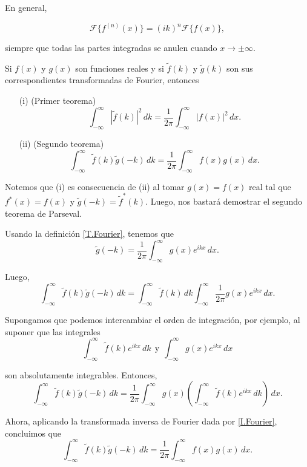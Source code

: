 En general,
\begin{shaded}
$$\mathcal{F}\{f^{(n)} (x)\} = (i k)^n \mathcal{F}\{f(x)\},$$    
\end{shaded}

siempre que todas las partes integradas se anulen cuando $x \to \pm \infty$.

\begin{teorema}[de Parseval]
Si $f(x)$ y $g(x)$ son funciones reales y si $\tilde{f}(k)$ y $\tilde{g}(k)$ son sus correspondientes transformadas de Fourier, entonces

\begin{itemize}
    \item[(i)] (Primer teorema)
    $$\int_{-\infty}^{\infty} |\tilde{f}(k)|^2\, dk = \frac{1}{2\pi} \int_{-\infty}^{\infty} |f(x)|^2 \, dx. $$
    
    \item[(ii)] (Segundo teorema)
    $$\int_{-\infty}^{\infty} \tilde{f}(k) \tilde{g}(-k) \, dk = \frac{1}{2\pi} \int_{-\infty}^{\infty} f(x) g(x) \, dx. $$
    
\end{itemize}
\end{teorema}

\begin{demo}
Notemos que (i) es consecuencia de (ii) al tomar $g(x) = f(x)$ real tal que $f^*(x) = f(x)$ y $\tilde{g}(-k) = \tilde{f}^*(k)$. Luego, nos bastará demostrar el segundo teorema de Parseval.

Usando la definición \eqref{T.Fourier}, tenemos que 
$$\tilde{g}(-k) = \frac{1}{2\pi} \int_{-\infty}^{\infty} g(x) e^{ikx} \,dx.$$

Luego, 
$$\int_{-\infty}^{\infty} \tilde{f}(k) \tilde{g}(-k) \,dk = \int_{-\infty}^{\infty} \tilde{f}(k) \,dk \int_{-\infty}^{\infty} \frac{1}{2\pi} g(x) e^{ikx} \,dx.$$

Supongamos que podemos intercambiar el orden de integración, por ejemplo, al suponer que las integrales 
$$\int_{-\infty}^{\infty} \tilde{f}(k) e^{ikx} \,dk ~~\mbox{y}~~ \int_{-\infty}^{\infty} g(x) e^{ikx} \,dx$$

son absolutamente integrables. Entonces,
$$\int_{-\infty}^{\infty} \tilde{f}(k) \tilde{g}(-k) \,dk = \frac{1}{2\pi} \int_{-\infty}^{\infty} g(x) \left(  \int_{-\infty}^{\infty}  \tilde{f}(k) e^{ikx} \,dk\right) \,dx.$$

Ahora, aplicando la transformada inversa de Fourier dada por \eqref{I.Fourier}, concluimos que
$$\int_{-\infty}^{\infty} \tilde{f}(k) \tilde{g}(-k) \,dk = \frac{1}{2\pi} \int_{-\infty}^{\infty} f(x) g(x)  \,dx.$$

\end{demo}

